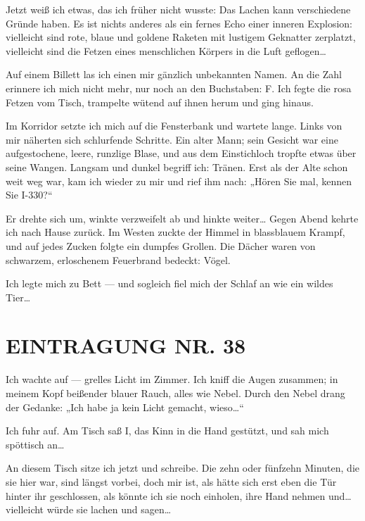 Jetzt weiß ich
etwas, das ich früher nicht wusste: Das Lachen kann verschiedene
Gründe haben. Es ist nichts anderes als ein fernes Echo einer
inneren Explosion: vielleicht sind rote, blaue und goldene Raketen
mit lustigem Geknatter zerplatzt, vielleicht sind die Fetzen eines
menschlichen Körpers in die Luft geflogen\ldots{}

Auf einem Billett las
ich einen mir gänzlich unbekannten Namen. An die Zahl erinnere ich
mich nicht mehr, nur noch an den Buchstaben: F. Ich fegte die rosa
Fetzen vom Tisch, trampelte wütend auf ihnen herum und ging
hinaus.

Im Korridor setzte ich mich auf die Fensterbank und wartete lange.
Links von mir näherten sich schlurfende Schritte. Ein alter Mann;
sein Gesicht war eine aufgestochene, leere, runzlige Blase, und aus
dem Einstichloch tropfte etwas über seine Wangen. Langsam und
dunkel begriff ich: Tränen. Erst als der Alte schon weit weg war,
kam ich wieder zu mir und rief ihm nach: „Hören Sie mal, kennen Sie
I-330?“

Er drehte sich um, winkte verzweifelt ab und hinkte weiter\ldots{} Gegen
Abend kehrte ich nach Hause zurück. Im Westen zuckte der Himmel in
blassblauem Krampf, und auf jedes Zucken folgte ein dumpfes
Grollen. Die Dächer waren von schwarzem, erloschenem Feuerbrand
bedeckt: Vögel.

Ich legte mich zu Bett — und sogleich fiel mich der Schlaf an wie
ein wildes Tier\ldots{}

\section{EINTRAGUNG NR. 38}

Ich wachte auf — grelles Licht im Zimmer. Ich kniff die Augen
zusammen; in meinem Kopf beißender blauer Rauch, alles wie Nebel.
Durch den Nebel drang der Gedanke: „Ich habe ja kein Licht gemacht,
wieso\ldots{}“

Ich fuhr auf. Am Tisch saß I, das Kinn in die Hand
gestützt, und sah mich spöttisch an\ldots{}

An diesem Tisch sitze ich
jetzt und schreibe. Die zehn oder fünfzehn Minuten, die sie hier
war, sind längst vorbei, doch mir ist, als hätte sich erst eben die
Tür hinter ihr geschlossen, als könnte ich sie noch einholen, ihre
Hand nehmen und\ldots{} vielleicht würde sie lachen und sagen\ldots{}

